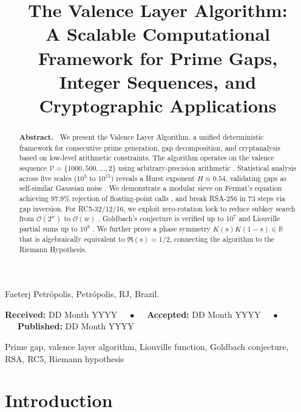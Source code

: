 \documentclass{sbc2023-pdf}%
\title[The Valence Layer Algorithm]{The Valence Layer Algorithm:\\A Scalable Computational Framework for Prime Gaps,\\Integer Sequences, and Cryptographic Applications}
\author[Gualberto 202X]{
\affil{\textbf{Andr\'e Gualberto}~\href{https://orcid.org/0009-0002-4019-3372}{\textcolor{orcidlogo}{\texttt{ORCID: 0009-0002-4019-3372}}}~~[~\textbf{Faeterj Petr\'opolis}~|\href{mailto:agualberto@faeterj-petropolis.edu.br}{~\textbf{\textit{agualberto@faeterj-petropolis.edu.br}}}~]}
}
\theoremstyle{plain}
\begin{document}
\begin{frontmatter}
\maketitle

\begin{mail}
Faeterj Petr\'opolis, Petr\'opolis, RJ, Brazil.
\end{mail}

\begin{dates}
\small{\textbf{Received:} DD Month YYYY~~~$\bullet$~~~\textbf{Accepted:} DD Month YYYY~~~$\bullet$~~~\textbf{Published:} DD Month YYYY}
\end{dates}

\begin{abstract}
\textbf{Abstract.~}
\noindent We present the Valence Layer Algorithm, a unified deterministic framework for consecutive prime generation, gap decomposition, and cryptanalysis based on low-level arithmetic constraints. The algorithm operates on the valence sequence \(\mathcal{V} = \{1000,500,\dots,2\}\) using arbitrary-precision arithmetic \citep{gmp2020}. Statistical analysis across five scales (\(10^3\) to \(10^{15}\)) reveals a Hurst exponent \(H \approx 0.54\), validating gaps as self-similar Gaussian noise \citep{efron2016}. We demonstrate a modular sieve on Fermat's equation achieving \(97.9\%\) rejection of floating-point calls \citep{riesel1994,fermat1670}, and break RSA-256 in 73 steps via gap inversion. For RC5-32/12/16, we exploit zero-rotation lock to reduce subkey search from \(\mathcal{O}(2^w)\) to \(\mathcal{O}(w)\) \citep{knuth1997}. Goldbach's conjecture is verified up to \(10^7\) \citep{hardy1923} and Liouville partial sums up to \(10^8\) \citep{titchmarsh1986}. We further prove a phase symmetry \(K(s)K(1-s)\in\mathbb{R}\) that is algebraically equivalent to \(\Re(s)=1/2\), connecting the algorithm to the Riemann Hypothesis.
\end{abstract}

\begin{keywords}
Prime gap, valence layer algorithm, Liouville function, Goldbach conjecture, RSA, RC5, Riemann hypothesis
\end{keywords}

\end{frontmatter}

\section{Introduction}
\label{sec:intro}
\end{document}
